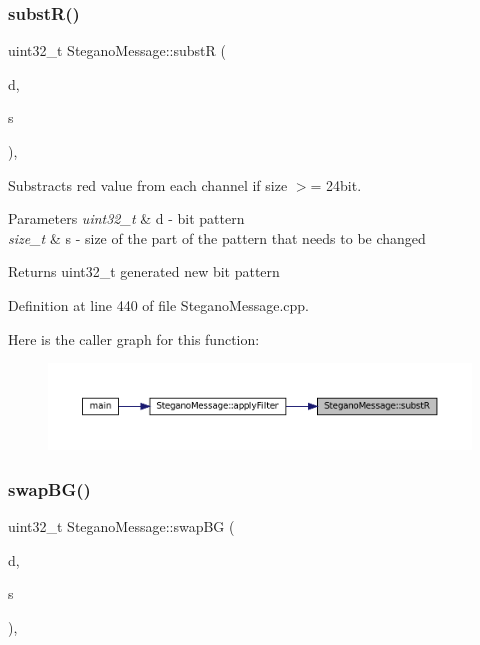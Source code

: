 \subsubsection{\texorpdfstring{substR()}{substR()}}
{\footnotesize\ttfamily uint32\+\_\+t Stegano\+Message\+::substR (\begin{DoxyParamCaption}\item[{uint32\+\_\+t}]{d,  }\item[{size\+\_\+t}]{s }\end{DoxyParamCaption})\hspace{0.3cm}{\ttfamily [static]}, {\ttfamily [private]}}



Substracts red value from each channel if size $>$= 24bit. 


\begin{DoxyParams}{Parameters}
{\em uint32\+\_\+t} & d -\/ bit pattern \\
\hline
{\em size\+\_\+t} & s -\/ size of the part of the pattern that needs to be changed \\
\hline
\end{DoxyParams}
\begin{DoxyReturn}{Returns}
uint32\+\_\+t generated new bit pattern 
\end{DoxyReturn}


Definition at line 440 of file Stegano\+Message.\+cpp.

Here is the caller graph for this function\+:
\nopagebreak
\begin{figure}[H]
\begin{center}
\leavevmode
\includegraphics[width=350pt]{classSteganoMessage_a021f0126410e739bc89ac2458198ad0c_icgraph}
\end{center}
\end{figure}
\mbox{\label{classSteganoMessage_a06f64f5198cf180771dfe692125936be}} 
\subsubsection{\texorpdfstring{swapBG()}{swapBG()}}
{\footnotesize\ttfamily uint32\+\_\+t Stegano\+Message\+::swap\+BG (\begin{DoxyParamCaption}\item[{uint32\+\_\+t}]{d,  }\item[{size\+\_\+t}]{s }\end{DoxyParamCaption})\hspace{0.3cm}{\ttfamily [static]}, {\ttfamily [private]}}



